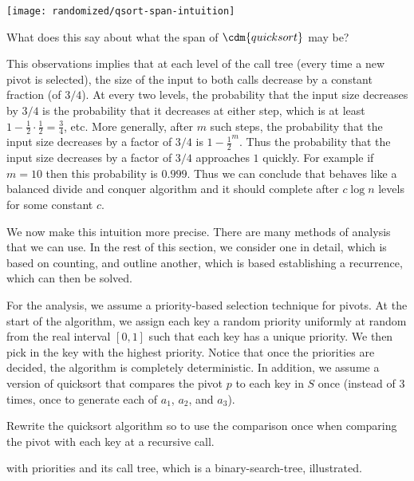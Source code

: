 {\begin{center}
\centering
\texttt{[image: randomized/qsort-span-intuition]}
\end{center}

\begin{question}
What does this say about what the span of $\cdm{\qsort{}}$ may be? 
\end{question}

This observations implies that at each level of the call tree (every
time a new pivot is selected), the size of the input to both calls
decrease by a constant fraction (of $3/4$).
%
At every two levels, the probability that the input size decreases by
$3/4$ is the probability that it decreases at either step, which is at
least $1-\frac12 \cdot \frac12 = \frac34$, etc.
%
More generally, after $m$ such steps, the probability that the input
size decreases by a factor of $3/4$ is $1 - \frac{1}{2}^m$.
%
Thus the probability that the input size decreases by a factor of
$3/4$ approaches $1$ quickly.  For example if $m = 10$ then this
probability is $0.999$.
%
Thus we can conclude that \qsort{} behaves like a balanced divide and
conquer algorithm and it should complete after $c\log{n}$ levels for
some constant $c$.


We now make this intuition more precise.  There are many methods of
analysis that we can use.  In the rest of this section, we consider
one in detail, which is based on counting, and outline another, which
is based establishing a recurrence, which can then be solved.
%

For the analysis, we assume a priority-based selection technique for
pivots.
%
At the start of the algorithm, we assign each key a random priority
uniformly at random from the real interval $[0, 1]$ such that each key
has a unique priority.  
%
We then pick in 
the key with the highest priority.  Notice that once the priorities
are decided, the algorithm is completely deterministic.
%
In addition, we assume a version of quicksort that compares the pivot
$p$ to each key in $S$ once (instead of 3 times, once to generate each
of $a_1$, $a_2$, and $a_3$).
%
\begin{exercise}
  Rewrite the quicksort algorithm so to use the comparison once when
  comparing the pivot with each key at a recursive call.
\end{exercise}
%


\begin{example}

\Qsort{} with priorities and its call tree, which is a binary-search-tree, illustrated. 


\end{example}}
